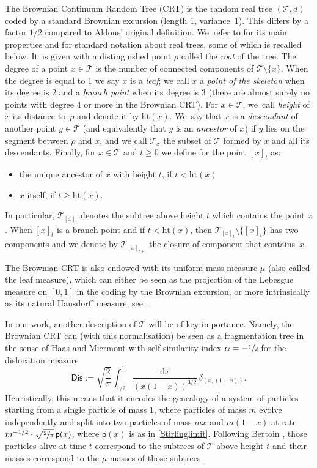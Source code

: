 \documentclass[11pt]{article}
\newcommand{\pp}{\mathsf{p}}
\newcommand{\T}{\mathcal{T}}\let\CRT\T\let\tbr\T
\newcommand{\h}{\mathrm{ht}}
\theoremstyle{definition}
\begin{document}
The Brownian Continuum Random Tree (CRT) is the random real tree $(\mathcal{T}, d)$ coded by a standard Brownian excursion (length $1$, variance~$1$). This differs by a factor $1/2$ compared to Aldous' original definition. We~refer to \cite{LG2005} for its main properties and for standard notation about real trees, some of which is recalled below. It~is given with a distinguished point $ \rho$ called the \emph{root} of the tree. The degree of a point $x \in \mathcal{T}$ is the number of connected components of $\T\setminus \{x\}$. When the degree is equal to $1$ we say $x$ is a \emph{leaf}; we call $x$ a \emph{point of the skeleton} when its degree is $2$ and a \emph{branch point} when its degree is $3$ (there are almost surely no points with degree $4$ or more in the Brownian CRT). For $x\in \T$, we~call \emph{height} of $x$ its distance to~$\rho$ and denote it by $\h(x)$. We~say that $x$ is a \emph{descendant} of another point $y\in\T$ (and equivalently that $y$ is an \emph{ancestor} of $x$) if $y$ lies on the segment between $\rho$ and $x$, and we call $\T_x$ the subset of $\T$ formed by $x$ and all its descendants. Finally, for $x \in \T$ and $t\geq 0$ we define for the point $[x]_t$ as:
\begin{itemize}
\item the unique ancestor of $x$ with height $t$, if $t< \h(x)$
\item $x$ itself, if $t\geq \h(x)$.
\end{itemize}
In particular, $ \T_{[x]_t}$ denotes the subtree above height $t$ which contains the point $x$. When $[x]_t$ is a branch point and if $t < \h(x)$, then $\T_{[x]_t} \setminus \{[x]_t\}$ has two components and we denote by $ \mathcal{T}_{[x]_{t+}}$ the closure of component that contains~$x$.

The Brownian CRT is also endowed with its uniform mass measure $\mu$ (also called the leaf measure), which can either be seen as the projection of the Lebesgue measure on $[0,1]$ in the coding by the Brownian excursion, or more intrinsically as its natural Hausdorff measure, see \cite{duquesne2005probabilistic,duquesne2006hausdorff}.

In our work, another description of $\mathcal{T}$ will be of key importance. Namely, the Brownian CRT can (with this normalisation) be seen as a fragmentation tree in the sense of Haas and Miermont \cite{HM04} with self-similarity index $\alpha = - \sfrac{1}{2}$ for the dislocation measure
\begin{equation}
\label{eq:Dislocation}
\mathsf{Dis} := \sqrt{\frac{2}{\pi}} \int_{1/2}^{1} \frac{ \mathrm{d}x}{(x(1-x))^{3/2}}\, \delta_{(x,(1-x))}.
\end{equation}
Heuristically, this means that it encodes the genealogy of a system of particles starting from a single particle of mass $1$, where particles of mass $m$ evolve independently and split into two particles of mass $mx$ and $m(1-x)$ at rate $m^{-1/2} \cdot \sqrt{\sfrac{2}{\pi}}\, \pp(x)$, where $\pp(x)$ is as in \eqref{Stirlinglimit}. Following Bertoin \cite{bertoin2002self}, those particles alive at time $t$ correspond to the subtrees of $\T$ above height $t$ and their masses correspond to the $\mu$-masses of those subtrees.
\end{document}
